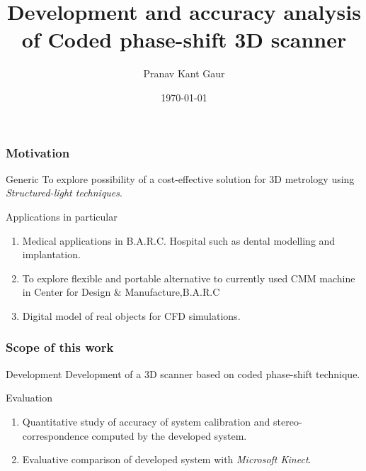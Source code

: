 \documentclass[9pt]{beamer}
\title[M.Tech project presentation]{Development and accuracy analysis of Coded phase-shift 3D scanner}
\author{Pranav Kant Gaur}
\institute[Computer Division]
{
Computer Division \\
\medskip
{\emph{pranav@barc.gov.in}}
}
\date{\today}
\begin{document}
\begin{frame}
\titlepage
\end{frame}

\begin{frame}
\frametitle{Motivation}
\begin{block}
{Generic}
To explore possibility of a cost-effective solution for 3D metrology using \textit{Structured-light techniques}.
\end{block}
\begin{block}
{Applications in particular}
\begin{enumerate}
\item Medical applications in B.A.R.C. Hospital such as dental modelling and implantation.
\item To explore flexible and portable alternative to currently used CMM machine in Center for Design \& Manufacture,B.A.R.C
\item Digital model of real objects for CFD simulations.
\end{enumerate}
\end{block}
\end{frame}

\begin{frame}
\frametitle{Scope of this work}
\begin{block}
{Development}
Development of a 3D scanner based on coded phase-shift technique.\newline
\end{block}
\begin{block}
{Evaluation}
\begin{enumerate}
\item Quantitative study of accuracy of system calibration and stereo-correspondence computed by the developed system.
\item Evaluative comparison of developed system with \textit{Microsoft Kinect}.
\end{enumerate}
\end{block}
\end{frame}
\end{document}

